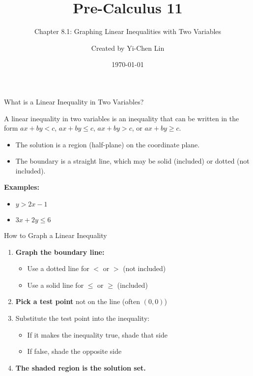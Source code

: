 \documentclass[aspectratio=169]{beamer}
\title{Pre-Calculus 11}
\subtitle{Chapter 8.1: Graphing Linear Inequalities with Two Variables}
\author{Created by Yi-Chen Lin}
\date{\today}
\begin{document}
\begin{frame}
    \titlepage
\end{frame}

\begin{frame}{What is a Linear Inequality in Two Variables?}
    \begin{tcolorbox}[colback=lightgray,colframe=primary,title=Definition]
        \footnotesize
        A linear inequality in two variables is an inequality that can be written in the form $ax + by < c$, $ax + by \leq c$, $ax + by > c$, or $ax + by \geq c$.
        \begin{itemize}
            \item The solution is a region (half-plane) on the coordinate plane.
            \item The boundary is a straight line, which may be solid (included) or dotted (not included).
        \end{itemize}
    \end{tcolorbox}
    \vspace{0.5em}
    \textbf{Examples:}
    \begin{itemize}
        \item $y > 2x - 1$
        \item $3x + 2y \leq 6$
    \end{itemize}
\end{frame}

\begin{frame}{How to Graph a Linear Inequality}
    \begin{tcolorbox}[colback=lightgray,colframe=primary,title=Step-by-Step Method]
        \footnotesize
        \begin{enumerate}
            \item \textcolor{accent}{\textbf{Graph the boundary line:}}
            \begin{itemize}
                \item Use a \textcolor{accent}{dotted line} for $<$ or $>$ (not included)
                \item Use a \textcolor{primary}{solid line} for $\leq$ or $\geq$ (included)
            \end{itemize}
            \item \textcolor{accent}{\textbf{Pick a test point}} not on the line (often $(0,0)$)
            \item Substitute the test point into the inequality:
            \begin{itemize}
                \item If it makes the inequality true, shade that side
                \item If false, shade the opposite side
            \end{itemize}
            \item \textcolor{accent}{\textbf{The shaded region is the solution set.}}
        \end{enumerate}
    \end{tcolorbox}
\end{frame}
\end{document}
